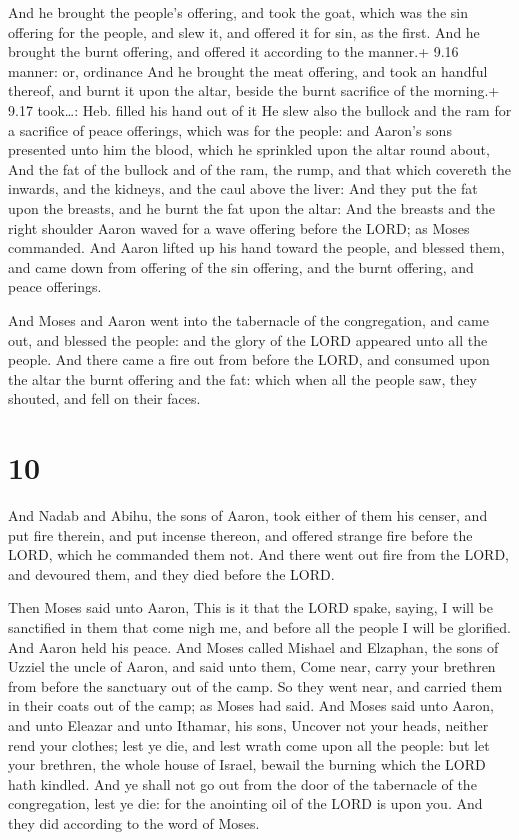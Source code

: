  And he brought the people's offering, and took the goat,
which was the sin offering for the people, and slew it, and offered it
for sin, as the first.  And he brought the burnt offering,
and offered it according to the manner.+ 9.16 manner: or, ordinance
 And he brought the meat offering, and took an handful
thereof, and burnt it upon the altar, beside the burnt sacrifice of the
morning.+ 9.17 took\ldots: Heb. filled his hand out of it 
He slew also the bullock and the ram for a sacrifice of peace offerings,
which was for the people: and Aaron's sons presented unto him the blood,
which he sprinkled upon the altar round about,  And the fat
of the bullock and of the ram, the rump, and that which covereth the
inwards, and the kidneys, and the caul above the liver: 
And they put the fat upon the breasts, and he burnt the fat upon the
altar:  And the breasts and the right shoulder Aaron waved
for a wave offering before the LORD; as Moses commanded. 
And Aaron lifted up his hand toward the people, and blessed them, and
came down from offering of the sin offering, and the burnt offering, and
peace offerings.

 And Moses and Aaron went into the tabernacle of the
congregation, and came out, and blessed the people: and the glory of the
LORD appeared unto all the people.  And there came a fire
out from before the LORD, and consumed upon the altar the burnt offering
and the fat: which when all the people saw, they shouted, and fell on
their faces.

\hypertarget{section-9}{%
\section{10}\label{section-9}}

 And Nadab and Abihu, the sons of Aaron, took either of them
his censer, and put fire therein, and put incense thereon, and offered
strange fire before the LORD, which he commanded them not. 
And there went out fire from the LORD, and devoured them, and they died
before the LORD.

 Then Moses said unto Aaron, This is it that the LORD spake,
saying, I will be sanctified in them that come nigh me, and before all
the people I will be glorified. And Aaron held his peace. 
And Moses called Mishael and Elzaphan, the sons of Uzziel the uncle of
Aaron, and said unto them, Come near, carry your brethren from before
the sanctuary out of the camp.  So they went near, and
carried them in their coats out of the camp; as Moses had said.
 And Moses said unto Aaron, and unto Eleazar and unto
Ithamar, his sons, Uncover not your heads, neither rend your clothes;
lest ye die, and lest wrath come upon all the people: but let your
brethren, the whole house of Israel, bewail the burning which the LORD
hath kindled.  And ye shall not go out from the door of the
tabernacle of the congregation, lest ye die: for the anointing oil of
the LORD is upon you. And they did according to the word of Moses.

